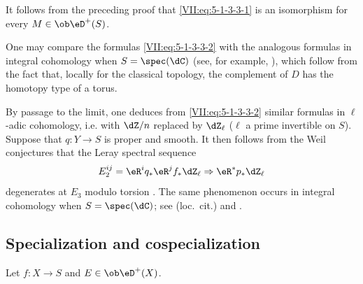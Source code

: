 It follows from the preceding proof that \eqref{VII:eq:5-1-3-3-1} is an
isomorphism for every $M\in\ob\eD^+(S)$.

One may compare the formulas \eqref{VII:eq:5-1-3-3-2} with the analogous
formulas in integral cohomology when $S=\spec(\dC)$ (see, for example,
), which follow from the fact that, locally for the classical
topology, the complement of $D$ has the homotopy type of a torus.

By passage to the limit, one deduces from \eqref{VII:eq:5-1-3-3-2} similar
formulas in $\ell$-adic cohomology, i.e. with $\dZ/n$ replaced by $\dZ_\ell$
($\ell$ a prime invertible on $S$). Suppose that $q:Y\to S$ is proper and
smooth. It then follows from the Weil conjectures  that the
Leray spectral sequence
\[
  E_2^{i j} = \eR^i q_\ast \eR^j f_\ast \dZ_\ell \Rightarrow \eR^\ast p_\ast \dZ_\ell 
\]
degenerates at $E_3$ modulo torsion . The same phenomenon
occurs in integral cohomology when $S=\spec(\dC)$; see (loc.\ cit.) and
.





\subsection{Specialization and cospecialization}\label{VII:5-2}

Let $f:X\to S$ and $E\in\ob\eD^+(X)$.






\subsubsection{}\label{VII:5-2-1}

